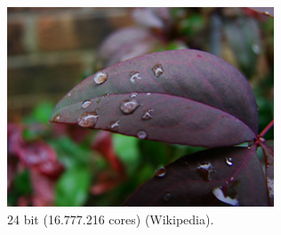 \begin{frame}[allowframebreaks]
\begin{columns}[T]
    \begin{figure}[h!]
    \centering
    \includegraphics[width=\textwidth]{images/colordepth-24bit.png}
    \caption{24 bit (16.777.216 cores) (Wikipedia).}
    \label{fig:colordepth-24bit}
    \end{figure}  
  \end{columns}
\end{frame}
